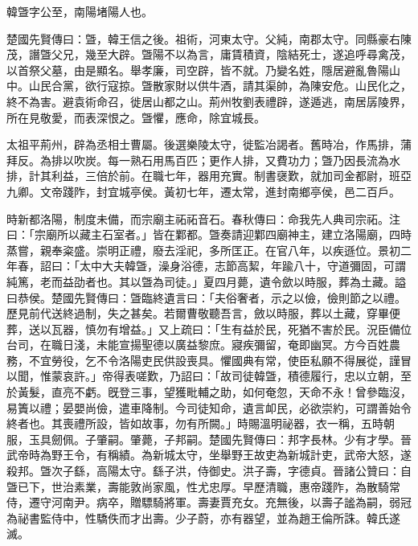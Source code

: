 
\begin{pinyinscope}
韓曁字公至，南陽堵陽人也。

楚國先賢傳曰：曁，韓王信之後。祖術，河東太守。父純，南郡太守。同縣豪右陳茂，譖曁父兄，幾至大辟。曁陽不以為言，庸賃積資，陰結死士，遂追呼尋禽茂，以首祭父墓，由是顯名。舉孝廉，司空辟，皆不就。乃變名姓，隱居避亂魯陽山中。山民合黨，欲行寇掠。曁散家財以供牛酒，請其渠帥，為陳安危。山民化之，終不為害。避袁術命召，徙居山都之山。荊州牧劉表禮辟，遂遁逃，南居孱陵界，所在見敬愛，而表深恨之。曁懼，應命，除宜城長。

太祖平荊州，辟為丞相士曹屬。後選樂陵太守，徙監冶謁者。舊時冶，作馬排，蒲拜反。為排以吹炭。每一熟石用馬百匹；更作人排，又費功力；曁乃因長流為水排，計其利益，三倍於前。在職七年，器用充實。制書襃歎，就加司金都尉，班亞九卿。文帝踐阼，封宜城亭侯。黃初七年，遷太常，進封南鄉亭侯，邑二百戶。

時新都洛陽，制度未備，而宗廟主祏祏音石。春秋傳曰：命我先人典司宗祏。注曰：「宗廟所以藏主石室者。」皆在鄴都。曁奏請迎鄴四廟神主，建立洛陽廟，四時蒸嘗，親奉粢盛。崇明正禮，廢去淫祀，多所匡正。在官八年，以疾遜位。景初二年春，詔曰：「太中大夫韓曁，澡身浴德，志節高絜，年踰八十，守道彌固，可謂純篤，老而益劭者也。其以曁為司徒。」夏四月薨，遺令歛以時服，葬為土藏。謚曰恭侯。楚國先賢傳曰：曁臨終遺言曰：「夫俗奢者，示之以儉，儉則節之以禮。歷見前代送終過制，失之甚矣。若爾曹敬聽吾言，斂以時服，葬以土藏，穿畢便葬，送以瓦器，慎勿有增益。」又上疏曰：「生有益於民，死猶不害於民。況臣備位台司，在職日淺，未能宣揚聖德以廣益黎庶。寢疾彌留，奄即幽冥。方今百姓農務，不宜勞役，乞不令洛陽吏民供設喪具。懼國典有常，使臣私願不得展從，謹冒以聞，惟蒙哀許。」帝得表嗟歎，乃詔曰：「故司徒韓曁，積德履行，忠以立朝，至於黃髮，直亮不虧。旣登三事，望獲毗輔之助，如何奄忽，天命不永！曾參臨沒，易簀以禮；晏嬰尚儉，遣車降制。今司徒知命，遺言卹民，必欲崇約，可謂善始令終者也。其喪禮所設，皆如故事，勿有所闕。」時賜溫明祕器，衣一稱，五時朝服，玉具劒佩。子肇嗣。肇薨，子邦嗣。楚國先賢傳曰：邦字長林。少有才學。晉武帝時為野王令，有稱績。為新城太守，坐舉野王故吏為新城計吏，武帝大怒，遂殺邦。曁次子繇，高陽太守。繇子洪，侍御史。洪子壽，字德貞。晉諸公贊曰：自曁已下，世治素業，壽能敦尚家風，性尤忠厚。早歷清職，惠帝踐阼，為散騎常侍，遷守河南尹。病卒，贈驃騎將軍。壽妻賈充女。充無後，以壽子謐為嗣，弱冠為祕書監侍中，性驕佚而才出壽。少子蔚，亦有器望，並為趙王倫所誅。韓氏遂滅。


\end{pinyinscope}